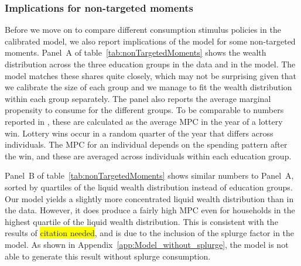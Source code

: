 \documentclass[\econtexRoot/HAFiscal]{subfiles}
\begin{document}
\hypertarget{non-targeted-moments}{}\par\subsubsection{Implications for non-targeted moments} 
\notinsubfile{\label{sec:nonTargetedMoments}}

Before we move on to compare different consumption stimulus policies in the calibrated model, we also report implications of the model for some non-targeted moments. Panel~A of table~\ref{tab:nonTargetedMoments} shows the wealth distribution across the three education groups in the data and in the model. The model matches these shares quite closely, which may not be surprising given that we calibrate the size of each group and we manage to fit the wealth distribution within each group separately. The panel also reports the average marginal propensity to consume for the different groups. To be comparable to numbers reported in \citet{fagereng_mpc_2021}, these are calculated as the average MPC in the year of a lottery win. Lottery wins occur in a random quarter of the year that differs across individuals. The MPC for an individual depends on the spending pattern after the win, and these are averaged across individuals within each education group. 

Panel~B of table~\ref{tab:nonTargetedMoments} shows similar numbers to Panel~A, sorted by quartiles of the liquid wealth distribution instead of education groups. Our model yields a slightly more concentrated liquid wealth distribution than in the data. However, it does produce a fairly high MPC even for households in the highest quartile of the liquid wealth distribution. This is consistent with the results of \colorbox{yellow}{citation needed}, and is due to the inclusion of the splurge factor in the model. As shown in Appendix~\ref{app:Model_without_splurge}, the model is not able to generate this result without splurge consumption. 
\end{document}
